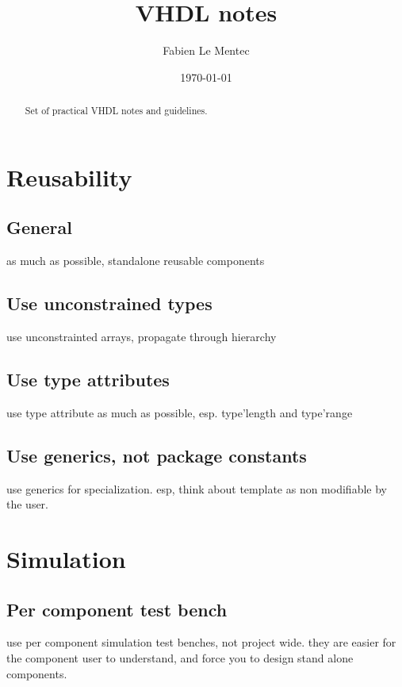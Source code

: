 \documentclass[12pt]{article}
\title{VHDL notes}
\author{Fabien Le Mentec}
\date{\today}
\begin{document}
\maketitle

\begin{abstract}
Set of practical VHDL notes and guidelines.
\end{abstract}
\newpage

\setcounter{tocdepth}{2}
\tableofcontents
\newpage


\newpage
\section{Reusability}

\subsection{General}
as much as possible, standalone reusable components


\subsection{Use unconstrained types}
use unconstrainted arrays, propagate through hierarchy


\subsection{Use type attributes}
use type attribute as much as possible, esp. type'length
and type'range


\subsection{Use generics, not package constants}
use generics for specialization. esp, think about template
as non modifiable by the user.


\newpage
\section{Simulation}

\subsection{Per component test bench}
use per component simulation test benches, not project wide.
they are easier for the component user to understand, and
force you to design stand alone components.


\newpage
\end{document}
